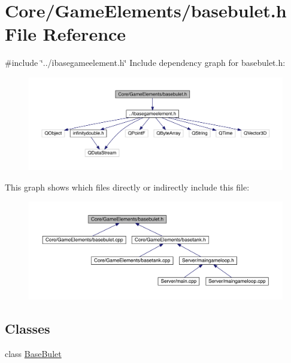 \hypertarget{a00035}{}\section{Core/\+Game\+Elements/basebulet.h File Reference}
\label{a00035}
{\ttfamily \#include \char`\"{}../ibasegameelement.\+h\char`\"{}}\newline
Include dependency graph for basebulet.\+h\+:
\nopagebreak
\begin{figure}[H]
\begin{center}
\leavevmode
\includegraphics[width=350pt]{de/d8c/a00036}
\end{center}
\end{figure}
This graph shows which files directly or indirectly include this file\+:
\nopagebreak
\begin{figure}[H]
\begin{center}
\leavevmode
\includegraphics[width=350pt]{d1/dc6/a00037}
\end{center}
\end{figure}
\subsection*{Classes}
\begin{DoxyCompactItemize}
\item 
class \hyperlink{a00153}{Base\+Bulet}
\end{DoxyCompactItemize}
